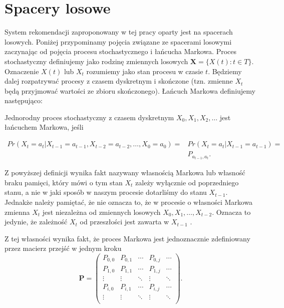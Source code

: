 \section{Spacery losowe}
\label{chap:spacerylosowe}

System rekomendacji zaproponowany w tej pracy oparty jest na spacerach losowych. Poniżej przypominamy pojęcia związane ze spacerami losowymi zaczynając od pojęcia procesu stochastycznego i łańcucha Markowa. Proces stochastyczny definiujemy jako rodzinę zmiennych losowych $\mathbf{X}=\{X(t): t \in T\}$. Oznaczenie $X(t)$ lub $X_t$ rozumiemy jako stan procesu w czasie $t$. 
Będziemy dalej rozpatrywać procesy z czasem dyskretnym i skończone (tzn. zmienne $X_t$ będą przyjmować wartości ze zbioru skończonego). Łańcuch Markowa definiujemy następująco:

\begin{definition}\label{def:markow}
Jednorodny proces stochastyczny z czasem dyskretnym $X_{0}, X_{1}, X_{2},\dots$ jest łańcuchem Markowa, jeśli \cite{Metodyksiazka}

\begin{equation}
\begin{aligned}
    Pr(X_{t}= a_{t} | X_{t-1} = a_{t-1}, X_{t-2} = a_{t-2},\dots, X_{0} = a_{0}) = & Pr(X_{t} = a_{t} | X_{t-1} = a_{t-1}) = \\ & P_{a_{t-1},a_{t}} .
\end{aligned}
\end{equation}
\end{definition}

Z powyższej definicji wynika fakt nazywany własnością Markowa lub własność braku pamięci, który mówi o tym stan $X_{t}$ zależy wyłącznie od poprzedniego stanu, a nie w jaki sposób w naszym procesie dotarliśmy do stanu $X_{t-1}$. Jednakże należy pamiętać, że nie oznacza to, że w procesie o własności Markowa zmienna $X_{t}$ jest niezależna od zmiennych losowych $X_{0},X_{1},\dots,X_{t-2}$.
Oznacza to jedynie, że zależność $X_t$ od przeszłości jest zawarta w $X_{t-1}$ \cite{Metodyksiazka}.

Z tej własności wynika fakt, że proces Markowa jest jednoznacznie zdefiniowany przez macierz przejść w jednym kroku
\begin{equation*}
\bm{P} =
\left(\begin{array}{ccccc}
P_{0,0} & P_{0,1}  & \cdots & P_{0,j} & \cdots \\
P_{1,0} & P_{1,1}  & \cdots & P_{1,j} & \cdots \\
\vdots & \vdots & \ddots & \vdots & \ddots \\
P_{i,0} & P_{i,1}  & \cdots & P_{i,j} & \cdots \\
\vdots & \vdots & \ddots & \vdots & \ddots \\
\end{array}\right) .
\label{eq:postac}
\end{equation*} 

